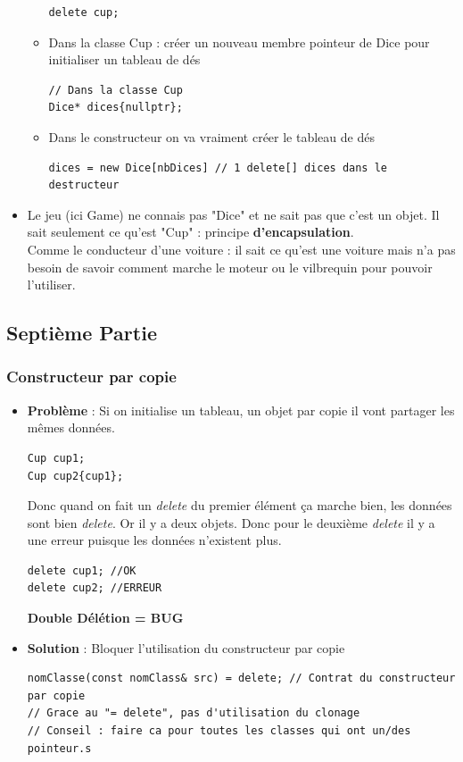 \documentclass[12pt,a4paper]{article}
\begin{document}
\begin{itemize}
\begin{itemize}
\begin{lstlisting}
delete cup;
\end{lstlisting}
\item Dans la classe Cup : créer un nouveau membre pointeur de Dice pour initialiser un tableau de dés
\begin{lstlisting}
// Dans la classe Cup
Dice* dices{nullptr};
\end{lstlisting}
\item Dans le constructeur on va vraiment créer le tableau de dés
\begin{lstlisting}
dices = new Dice[nbDices] // 1 delete[] dices dans le destructeur
\end{lstlisting}
\end{itemize}
\item Le jeu (ici Game) ne connais pas "Dice" et ne sait pas que c'est un objet. Il sait seulement ce qu'est "Cup" : principe \textbf{d'encapsulation}.\\
Comme le conducteur d'une voiture : il sait ce qu'est une voiture mais n'a pas besoin de savoir comment marche le moteur ou le vilbrequin pour pouvoir l'utiliser.
\end{itemize}

\subsection{Septième Partie}
\subsubsection{Constructeur par copie}
\begin{itemize}
\item \textbf{Problème} : Si on initialise un tableau, un objet par copie il vont partager les mêmes données.
\begin{lstlisting}
Cup cup1;
Cup cup2{cup1};
\end{lstlisting}
Donc quand on fait un \textit{delete} du premier élément ça marche bien, les données sont bien \textit{delete}. Or il y a deux objets. Donc pour le deuxième \textit{delete} il y a une erreur puisque les données n'existent plus.
\begin{lstlisting}
delete cup1; //OK
delete cup2; //ERREUR
\end{lstlisting} \textbf{Double Délétion = BUG}
\end{itemize}
\begin{itemize}
\item \textbf{Solution} : Bloquer l'utilisation du constructeur par copie 
\begin{lstlisting}
nomClasse(const nomClass& src) = delete; // Contrat du constructeur par copie 
// Grace au "= delete", pas d'utilisation du clonage
// Conseil : faire ca pour toutes les classes qui ont un/des pointeur.s
\end{lstlisting}
\end{itemize}
\end{document}
